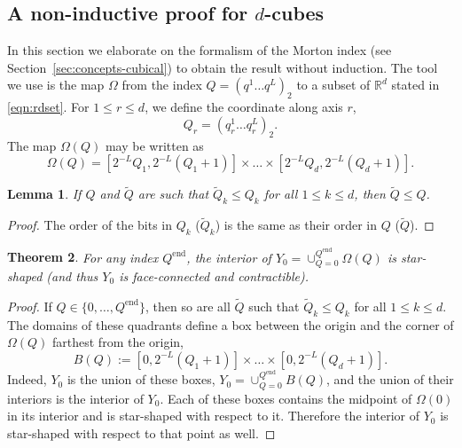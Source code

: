 \documentclass[a4paper,11pt]{article}
\newcommand{\eqnlab}[1]{\label{eqn:#1}}
\newcommand{\eqnref}[1]{\eqref{eqn:#1}}
\newcommand{\seclab}[1]{\label{sec:#1}}
\newcommand{\secref}[1]{Section~\ref{sec:#1}}
\newcommand{\thmlab}[1]{\label{thm:#1}}
\newtheorem{thm}{Theorem}
\newtheorem{lem}[thm]{Lemma}
\begin{document}
\subsection{A non-inductive proof for $d$-cubes}
\seclab{nonrecursiveproofs}



In this section we elaborate on the formalism of the Morton index
(see \secref{concepts-cubical}) to obtain the result without induction.
The tool we use is the map $\Omega$ from the index
$Q=(q^1\dots q^L)_2$ to a subset of $\mathbb{R}^d$ stated in \eqnref{rdset}.
For $1\leq r \leq d$, we define the coordinate along axis $r$,
\begin{equation}
  \eqnlab{Qaxisr}
  Q_r = (q^1_r\dots q^L_r)_2.
\end{equation}
The map $\Omega(Q)$ may be written as
\begin{equation}
  \eqnlab{Qmapsimpler}
  \Omega(Q) = [2^{-L}Q_1, 2^{-L}(Q_1 + 1)] \times \dots \times
  [2^{-L}Q_d, 2^{-L}(Q_d + 1)].
\end{equation}

\begin{lem}
 If $Q$ and $\tilde{Q}$ are such that $\tilde{Q}_k \leq Q_k$ for all $1\leq
 k\leq d$, then $\tilde{Q} \leq Q$.
\end{lem}
\begin{proof}
  The order of the bits in $Q_k$ ($\tilde{Q}_k$) is the same as their order in
  $Q$ ($\tilde{Q}$).
\end{proof}

\begin{thm}
  \thmlab{Y0}
  For any index $Q^\text{end}$, the interior of $Y_0=\cup_{Q=0}^{Q^{\text{end}}}
  \Omega(Q)$ is star-shaped (and thus $Y_0$ is face-connected and contractible).
\end{thm}
\begin{proof}
  If $Q\in \{0,\dots,Q^{\text{end}}\}$, then so are all $\tilde{Q}$ such that
  $\tilde{Q}_k\leq Q_k$ for all $1\leq k \leq d$.  The domains of these
  quadrants define a box between the origin and the corner of $\Omega(Q)$
  farthest from the origin,
\begin{equation}
    B(Q) := [0,2^{-L} (Q_1 + 1)]\times \dots \times [0,2^{-L} (Q_d + 1)].
  \end{equation}
Indeed, $Y_0$ is the union of these boxes, $Y_0 = \cup_{Q=0}^{Q^{\text{end}}}
  B(Q)$, and the union of their interiors is the interior of $Y_0$.  Each of
  these boxes contains the midpoint of $\Omega(0)$ in its interior and is
  star-shaped with respect to it.  Therefore the interior of $Y_0$ is
  star-shaped with respect to that point as well.
\end{proof}
\end{document}
